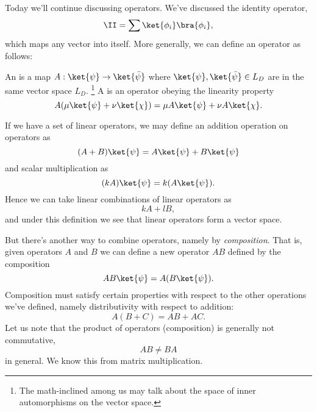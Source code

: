Today we'll continue discussing operators. We've discussed the identity operator,
\begin{equation}
    \II=\sum \ket{\phi_i}\bra{\phi_i},
\end{equation}
which maps any vector into itself. More generally, we can define an operator as follows:
\begin{defn}
    An  is a map $A:\ket{\psi}\to \ket{\bar \psi}$ where $\ket{\psi},\ket{\bar{\psi}}\in L_D$ are in the same vector space $L_D$.%
        \footnote{The math-inclined among us may talk about the space of inner automorphisms on the vector space.}
    A  is an operator obeying the linearity property
    \begin{equation}
        A(\mu\ket{\psi} + \nu \ket{\chi})=\mu A \ket{\psi}  + \nu A \ket{\chi}.
    \end{equation}
\end{defn}

If we have a set of linear operators, we may define an addition operation on operators as
\begin{equation}
    (A+B)\ket{\psi} = A \ket{\psi} + B \ket{\psi}
\end{equation}
and scalar multiplication as
\begin{equation}
    (k A)\ket{\psi} = k(A\ket{\psi}).
\end{equation}
Hence we can take linear combinations of linear operators as
\begin{equation}
    kA  + l B,
\end{equation}
and under this definition we see that linear operators form a vector space.

But there's another way to combine operators, namely by \emph{composition}. That is, given operators $A$ and $B$ we can define a new operator $AB$ defined by the composition
\begin{equation}
    AB\ket{\psi}=A(B\ket{\psi}).
\end{equation}
Composition must satisfy certain properties with respect to the other operations we've defined, namely distributivity with respect to addition:
\begin{equation}
    A(B+C)=AB+AC.
\end{equation}
Let us note that the product of operators (composition) is generally not commutative,
\begin{equation}
    AB\neq BA
\end{equation}
in general. We know this from matrix multiplication.

